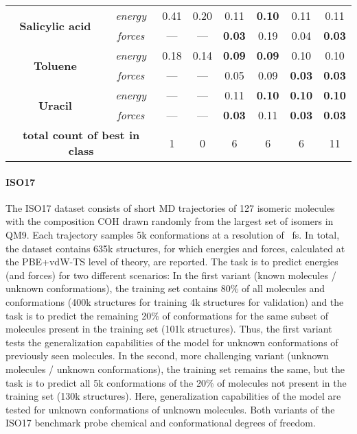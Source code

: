 \documentclass[12pt]{article}
\begin{document}
\begin{table}[htbp]
\begin{tabular}{c c c c c c c c}
\multirow{ 2}{*}{\bf Salicylic acid} &\textit{energy} & 0.41 & 0.20 & 0.11 & \bf 0.10 & 0.11 & 0.11\\
\addlinespace[1pt]
& \textit{forces} & --- & --- & \bf 0.03 & 0.19 & 0.04 & \bf 0.03\\
\midrule

\multirow{ 2}{*}{\bf Toluene} & \textit{energy} & 0.18 & 0.14 & \bf 0.09 & \bf 0.09 & 0.10 & 0.10\\
\addlinespace[1pt]
& \textit{forces} & --- & --- & 0.05 & 0.09 & \bf 0.03 & \bf 0.03\\
\midrule

\multirow{ 2}{*}{\bf Uracil} & \textit{energy} & --- & --- & 0.11 & \bf 0.10 & \bf 0.10 & \bf 0.10\\
\addlinespace[1pt]
& \textit{forces} & --- & --- & \bf 0.03 & 0.11 & \bf 0.03 & \bf 0.03\\
\midrule

\multicolumn{2}{c}{\textbf{total count of best in class}}  & 1 & 0 & 6 & 6 & 6 & 11\\

\bottomrule
\end{tabular}
\end{table}

\paragraph{ISO17}
The ISO17 dataset\cite{schutt2017schnet} consists of short MD
trajectories of \num{127} isomeric molecules with the composition
COH drawn randomly from the largest set of isomers
in QM9. Each trajectory samples 5k conformations at a resolution of
~fs. In total, the dataset contains 635k structures, for which
energies and forces, calculated at the
PBE+vdW-TS\cite{perdew1996generalized, tkatchenko2009accurate} level
of theory, are reported. The task is to predict energies (and forces)
for two different scenarios: In the first variant (known molecules /
unknown conformations), the training set contains 80\% of all
molecules and conformations (400k structures for training 4k
structures for validation) and the task is to predict the remaining
20\% of conformations for the same subset of molecules
present in the training set (101k structures). Thus, the first variant
tests the generalization capabilities of the model for unknown
conformations of previously seen molecules. In the second, more
challenging variant (unknown molecules / unknown conformations), the
training set remains the same, but the task is to predict all 5k
conformations of the 20\% of molecules not present in the
training set (130k structures). Here, generalization capabilities of
the model are tested for unknown conformations of unknown
molecules. Both variants of the ISO17 benchmark probe chemical and
conformational degrees of freedom.
\end{document}
